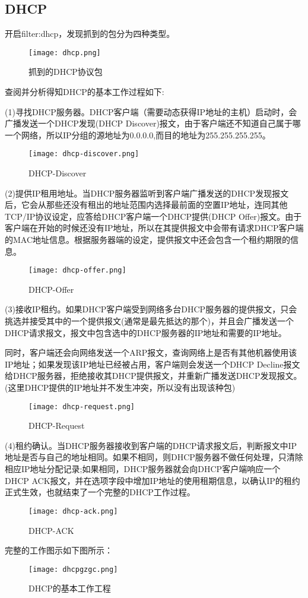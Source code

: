 \documentclass{xjtureport}
\begin{document}
\subsection{DHCP}
开启filter:dhcp，发现抓到的包分为四种类型。
\begin{figure}[H]
	\centering
	\texttt{[image: dhcp.png]}
	\caption{抓到的DHCP协议包}
\end{figure}
查阅并分析得知DHCP的基本工作过程如下:\par
(1)寻找DHCP服务器。DHCP客户端（需要动态获得IP地址的主机）启动时，会广播发送一个DHCP发现(DHCP Discover)报文，由于客户端还不知道自己属于哪一个网络，所以IP分组的源地址为0.0.0.0,而目的地址为255.255.255.255。
\begin{figure}[H]
	\centering
	\texttt{[image: dhcp-discover.png]}
	\caption{DHCP-Discover}
\end{figure}
(2)提供IP租用地址。当DHCP服务器监听到客户端广播发送的DHCP发现报文后，它会从那些还没有租出的地址范围内选择最前面的空置IP地址，连同其他TCP/IP协议设定，应答给DHCP客户端一个DHCP提供(DHCP Offer)报文。由于客户端在开始的时候还没有IP地址，所以在其提供报文中会带有请求DHCP客户端的MAC地址信息。根据服务器端的设定，提供报文中还会包含一个租约期限的信息。
\begin{figure}[H]
	\centering
	\texttt{[image: dhcp-offer.png]}
	\caption{DHCP-Offer}
\end{figure}
(3)接收IP租约。如果DHCP客户端受到网络多台DHCP服务器的提供报文，只会挑选并接受其中的一个提供报文(通常是最先抵达的那个)，并且会广播发送一个DHCP请求报文，报文中包含选中的DHCP服务器的IP地址和需要的IP地址。\par 
同时，客户端还会向网络发送一个ARP报文，查询网络上是否有其他机器使用该IP地址；如果发现该IP地址已经被占用，客户端则会发送一个DHCP Decline报文给DHCP服务器，拒绝接收其DHCP提供报文，并重新广播发送DHCP发现报文。(这里DHCP提供的IP地址并不发生冲突，所以没有出现该种包)
\begin{figure}[H]
	\centering
	\texttt{[image: dhcp-request.png]}
	\caption{DHCP-Request}
\end{figure}
(4)租约确认。当DHCP服务器接收到客户端的DHCP请求报文后，判断报文中IP地址是否与自己的地址相同。如果不相同，则DHCP服务器不做任何处理，只清除相应IP地址分配记录;如果相同，DHCP服务器就会向DHCP客户端响应一个DHCP ACK报文，并在选项字段中增加IP地址的使用租期信息，以确认IP的租约正式生效，也就结束了一个完整的DHCP工作过程。
\begin{figure}[H]
	\centering
	\texttt{[image: dhcp-ack.png]}
	\caption{DHCP-ACK}
\end{figure}
完整的工作图示如下图所示：
\begin{figure}[H]
	\centering
	\texttt{[image: dhcpgzgc.png]}
	\caption{DHCP的基本工作工程}
\end{figure}
\end{document}
